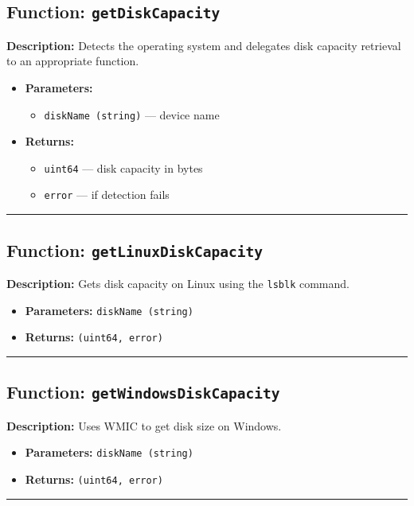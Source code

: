 \documentclass[12pt,a4paper]{article}
\begin{document}
\subsection*{Function: \texttt{getDiskCapacity}}
\textbf{Description:} Detects the operating system and delegates disk capacity retrieval to an appropriate function.
\begin{itemize}[leftmargin=2cm,label={--}]
  \item \textbf{Parameters:}
  \begin{itemize}
    \item \texttt{diskName (string)} — device name
  \end{itemize}
  \item \textbf{Returns:}
  \begin{itemize}
    \item \texttt{uint64} — disk capacity in bytes
    \item \texttt{error} — if detection fails
  \end{itemize}
\end{itemize}
\hrule\vspace{1em}

\subsection*{Function: \texttt{getLinuxDiskCapacity}}
\textbf{Description:} Gets disk capacity on Linux using the \texttt{lsblk} command.
\begin{itemize}[leftmargin=2cm,label={--}]
  \item \textbf{Parameters:} \texttt{diskName (string)}
  \item \textbf{Returns:} \texttt{(uint64, error)}
\end{itemize}
\hrule\vspace{1em}

\subsection*{Function: \texttt{getWindowsDiskCapacity}}
\textbf{Description:} Uses WMIC to get disk size on Windows.
\begin{itemize}[leftmargin=2cm,label={--}]
  \item \textbf{Parameters:} \texttt{diskName (string)}
  \item \textbf{Returns:} \texttt{(uint64, error)}
\end{itemize}
\hrule\vspace{1em}
\end{document}
